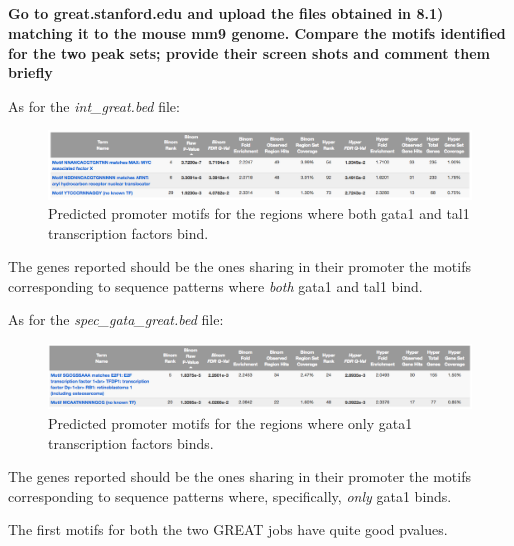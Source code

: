 \documentclass[12pt, a4paper]{article}
\begin{document}
	\subsection{}
	\textbf{Go to great.stanford.edu and upload the files obtained in 8.1) matching it to the mouse mm9 genome. Compare the motifs identified for the two peak sets; provide their screen shots and comment them briefly}
	
	As for the \textit{int\_great.bed} file:
	
	\begin{figure}[h]
		\centering
		\includegraphics[width = .99\textwidth]{int_great}
		\caption{Predicted promoter motifs for the regions where both gata1 and tal1 transcription factors bind.}
		\label{fig:int_great}
	\end{figure}
	
	The genes reported should be the ones sharing in their promoter the motifs corresponding to sequence patterns where \textit{both} gata1 and tal1 bind.
	
	As for the \textit{spec\_gata\_great.bed} file:
	
	\begin{figure}[h]
		\centering
		\includegraphics[width = .99\textwidth]{spec_gata_great}
		\caption{Predicted promoter motifs for the regions where only gata1 transcription factors binds.}
		\label{fig:spec_gata_great}
	\end{figure}
	
	The genes reported should be the ones sharing in their promoter the motifs corresponding to sequence patterns where, specifically, \textit{only} gata1 binds.
	
	The first motifs for both the two GREAT jobs have quite good pvalues.
	
\end{document}
